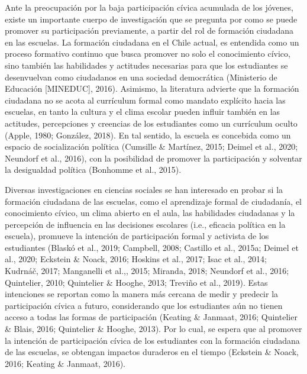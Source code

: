 \documentclass[12pt,twoside]{templates/facsothesis}
\begin{document}
Ante la preocupación por la baja participación cívica acumulada de los jóvenes, existe un importante cuerpo de investigación que se pregunta por como se puede promover su participación previamente, a partir del rol de formación ciudadana en las escuelas. La formación ciudadana en el Chile actual, es entendida como un proceso formativo continuo que busca promover no solo el conocimiento cívico, sino también las habilidades y actitudes necesarias para que los estudiantes se desenvuelvan como ciudadanos en una sociedad democrática (Ministerio de Educación {[}MINEDUC{]}, 2016). Asimismo, la literatura advierte que la formación ciudadana no se acota al currículum formal como mandato explícito hacia las escuelas, en tanto la cultura y el clima escolar pueden influir también en las actitudes, percepciones y creencias de los estudiantes como un currículum oculto (Apple, 1980; González, 2018). En tal sentido, la escuela es concebida como un espacio de socialización política (Cumsille \& Martínez, 2015; Deimel et al., 2020; Neundorf et al., 2016), con la posibilidad de promover la participación y solventar la desigualdad política (Bonhomme et al., 2015).

Diversas investigaciones en ciencias sociales se han interesado en probar si la formación ciudadana de las escuelas, como el aprendizaje formal de ciudadanía, el conocimiento cívico, un clima abierto en el aula, las habilidades ciudadanas y la percepción de influencia en las decisiones escolares (i.e., eficacia política en la escuela), promueve la intención de participación formal y activista de los estudiantes (Blaskó et al., 2019; Campbell, 2008; Castillo et al., 2015a; Deimel et al., 2020; Eckstein \& Noack, 2016; Hoskins et al., 2017; Isac et al., 2014; Kudrnáč, 2017; Manganelli et al.,, 2015; Miranda, 2018; Neundorf et al., 2016; Quintelier, 2010; Quintelier \& Hooghe, 2013; Treviño et al., 2019). Estas intenciones se reportan como la manera más cercana de medir y predecir la participación cívica a futuro, considerando que los estudiantes aún no tienen acceso a todas las formas de participación (Keating \& Janmaat, 2016; Quintelier \& Blais, 2016; Quintelier \& Hooghe, 2013). Por lo cual, se espera que al promover la intención de participación cívica de los estudiantes con la formación ciudadana de las escuelas, se obtengan impactos duraderos en el tiempo (Eckstein \& Noack, 2016; Keating \& Janmaat, 2016).
\end{document}
